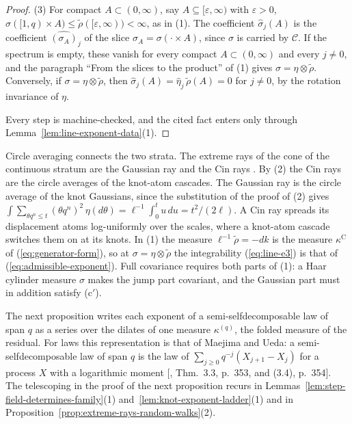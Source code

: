 \begin{proof}
(3) For compact $A \subset (0,\infty)$, say $A \subseteq [\varepsilon,\infty)$ with
$\varepsilon > 0$, $\sigma([1,q) \times A) \le \tilde\rho([\varepsilon,\infty)) < \infty$, as in (1).
The coefficient $\widehat\sigma_j(A)$ is the coefficient $\widehat{(\sigma_A)}_j$ of the slice
$\sigma_A = \sigma(\cdot \times A)$, since $\sigma$ is carried by $\mathcal{C}$. If the spectrum is
empty, these vanish for every compact $A \subset (0,\infty)$ and every $j \ne 0$, and the paragraph
``From the slices to the product'' of (1) gives $\sigma = \eta \otimes \tilde\rho$. Conversely, if
$\sigma = \eta \otimes \tilde\rho$, then $\widehat\sigma_j(A) = \widehat\eta_j\,\tilde\rho(A) = 0$
for $j \ne 0$, by the rotation invariance of $\eta$.

Every step is machine-checked, and the cited fact enters only through
Lemma~\ref{lem:line-exponent-data}(1).
\end{proof}

Circle averaging connects the two strata. The extreme rays of the cone of the continuous stratum are
the Gaussian ray and the Cin rays . By (2) the Cin rays
are the circle averages of the knot-atom cascades. The Gaussian ray is the circle average of the
knot Gaussians, since the substitution of the proof of (2) gives
$\int\sum_{\theta q^n \le t}(\theta q^n)^2\,\eta(d\theta) = \ell^{-1}\int_0^tu\,du = t^2/(2\ell)$.
A Cin ray spreads its displacement atoms log-uniformly over the scales, where a knot-atom cascade
switches them on at its knots. In (1) the measure $\ell^{-1}\tilde\rho = -dk$ is the measure
$\kappa^{\mathrm C}$ of (\ref{eq:generator-form}), so at $\sigma = \eta \otimes \tilde\rho$ the
integrability (\ref{eq:line-e3}) is that of (\ref{eq:admissible-exponent}). Full covariance requires both parts
of (1): a Haar cylinder measure $\sigma$ makes the jump part covariant, and the Gaussian part must
in addition satisfy (c$'$).

The next proposition writes each exponent of a semi-selfdecomposable law of span $q$ as a series
over the dilates of one measure $\kappa^{(q)}$, the folded \Levy{} measure of the residual. For laws
this representation is that of Maejima and Ueda: a semi-selfdecomposable law of span $q$ is the law
of $\sum_{j \ge 0}q^{-j}(X_{j+1} - X_j)$ for a \Levy{} process $X$ with a logarithmic moment
[, Thm.~3.3, p.~353, and (3.4), p.~354]. The telescoping in the proof
of the next proposition recurs in Lemmas~\ref{lem:step-field-determines-family}(1) and~\ref{lem:knot-exponent-ladder}(1)
and in Proposition~\ref{prop:extreme-rays-random-walks}(2).

